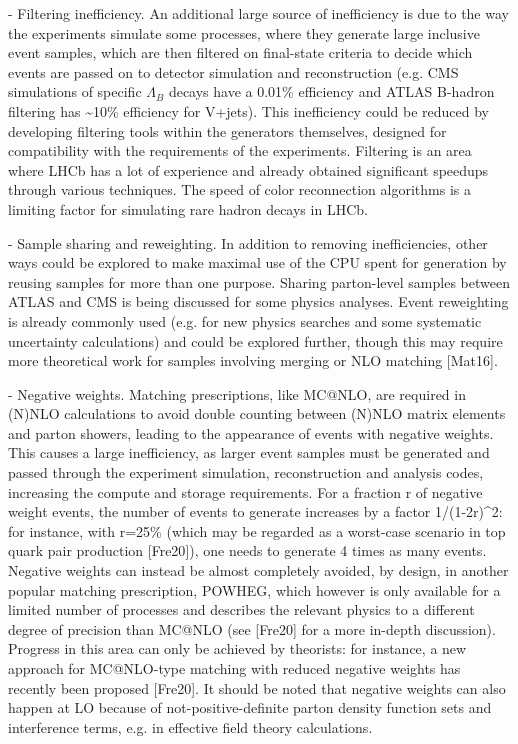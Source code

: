 \documentclass[11pt,a4paper]{article}
\begin{document}
- {Filtering inefficiency}. An additional large source of inefficiency
is due to the way the experiments simulate some processes, where they
generate large inclusive event samples, which are then ﬁltered on
ﬁnal-state criteria to decide which events are passed on to detector
simulation and reconstruction (e.g. CMS simulations of specific
$\Lambda_{B}$ decays have a 0.01\% efficiency and ATLAS B-hadron
filtering has \textasciitilde10\% efficiency for V+jets). This
inefficiency could be reduced by developing ﬁltering tools within the
generators themselves, designed for compatibility with the requirements
of the experiments. Filtering is an area where LHCb has a lot of
experience and already obtained significant speedups through various
techniques. The speed of color reconnection algorithms is a limiting
factor for simulating rare hadron decays in LHCb.

- {Sample sharing and reweighting}. In addition to removing
inefficiencies, other ways could be explored to make maximal use of the
CPU spent for generation by reusing samples for more than one purpose.
Sharing parton-level samples between ATLAS and CMS is being discussed
for some physics analyses. Event reweighting is already commonly used
(e.g. for new physics searches and some systematic uncertainty
calculations) and could be explored further, though this may require
more theoretical work for samples involving merging or NLO matching
{[}Mat16{]}.

- {Negative weights}. Matching prescriptions, like MC@NLO, are required
in (N)NLO calculations to avoid double counting between (N)NLO matrix
elements and parton showers, leading to the appearance of events with
negative weights. This causes a large inefficiency, as larger event
samples must be generated and passed through the experiment simulation,
reconstruction and analysis codes, increasing the compute and storage
requirements. For a fraction r of negative weight events, the number of
events to generate increases by a factor 1/(1-2r)\^{}2: for instance,
with r=25\% (which may be regarded as a worst-case scenario in top quark
pair production {[}Fre20{]}), one needs to generate 4 times as many
events. Negative weights can instead be almost completely avoided, by
design, in another popular matching prescription, POWHEG, which however
is only available for a limited number of processes and describes the
relevant physics to a different degree of precision than MC@NLO (see
{[}Fre20{]} for a more in-depth discussion). Progress in this area can
only be achieved by theorists: for instance, a new approach for
MC@NLO-type matching with reduced negative weights has recently been
proposed {[}Fre20{]}. It should be noted that negative weights can also
happen at LO because of not-positive-definite parton density function
sets and interference terms, e.g. in effective field theory
calculations.
\end{document}
